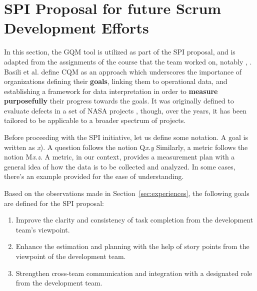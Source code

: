 \documentclass[conference]{IEEEtran}
\begin{document}
\section{SPI Proposal for future Scrum Development Efforts}
\label{sec:proposal}


In this section, the {\selectfont GQM} tool is utilized as part
of the SPI proposal, and is adapted from the assignments of the course that
the team worked on, notably \cite{DIT348A3}, \cite{DIT348A4}. Basili et al.
\cite{Caldiera1994} define CQM as an approach which underscores the
importance of organizations defining their \textbf{goals}, linking them to
operational data, and establishing a framework for data interpretation in order
to \textbf{measure purposefully} their progress towards the goals. It was
originally defined to evaluate defects in a set of NASA projects
\cite{Caldiera1994}, though, over the years, it has been tailored to be
applicable to a broader spectrum of projects.

Before proceeding with the SPI initiative, let us define some notation. A goal
is written as \textit{x}). A question follows the notion Q\textit{x.y}
Similarly, a metric follows the notion M\textit{x.z}. A metric, in our context,
provides a measurement plan with a general idea of how the data is to be
collected and analyzed. In some cases, there's an example provided for the ease
of understanding.

Based on the observations made in Section~\ref{sec:experiences}, the following
goals are defined for the SPI proposal:

\begin{enumerate}
  \item Improve the clarity and consistency of task completion from the
    development team’s viewpoint.
  \item Enhance the estimation and planning with the help of story points
    from the viewpoint of the development team. 
  \item Strengthen cross-team communication and integration with a
    designated role from the development team. 
\end{enumerate}
\end{document}
